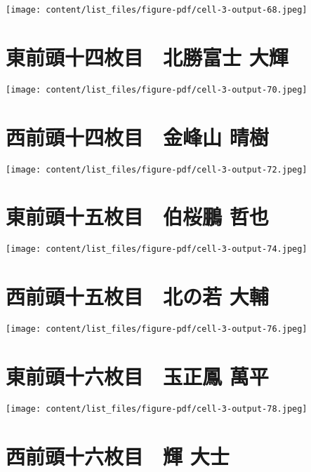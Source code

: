 \documentclass[
  letterpaper,
]{bxjsbook}
\begin{document}
\texttt{[image: content/list\_files/figure-pdf/cell-3-output-68.jpeg]}

\section{東前頭十四枚目　北勝富士
大輝}\label{ux6771ux524dux982dux5341ux56dbux679aux76ee-ux5317ux52ddux5bccux58eb-ux5927ux8f1d}

\texttt{[image: content/list\_files/figure-pdf/cell-3-output-70.jpeg]}

\section{西前頭十四枚目　金峰山
晴樹}\label{ux897fux524dux982dux5341ux56dbux679aux76ee-ux91d1ux5cf0ux5c71-ux6674ux6a39}

\texttt{[image: content/list\_files/figure-pdf/cell-3-output-72.jpeg]}

\section{東前頭十五枚目　伯桜鵬
哲也}\label{ux6771ux524dux982dux5341ux4e94ux679aux76ee-ux4f2fux685cux9d6c-ux54f2ux4e5f}

\texttt{[image: content/list\_files/figure-pdf/cell-3-output-74.jpeg]}

\section{西前頭十五枚目　北の若
大輔}\label{ux897fux524dux982dux5341ux4e94ux679aux76ee-ux5317ux306eux82e5-ux5927ux8f14}

\texttt{[image: content/list\_files/figure-pdf/cell-3-output-76.jpeg]}

\section{東前頭十六枚目　玉正鳳
萬平}\label{ux6771ux524dux982dux5341ux516dux679aux76ee-ux7389ux6b63ux9cf3-ux842cux5e73}

\texttt{[image: content/list\_files/figure-pdf/cell-3-output-78.jpeg]}

\section{西前頭十六枚目　輝
大士}\label{ux897fux524dux982dux5341ux516dux679aux76ee-ux8f1d-ux5927ux58eb}
\end{document}
